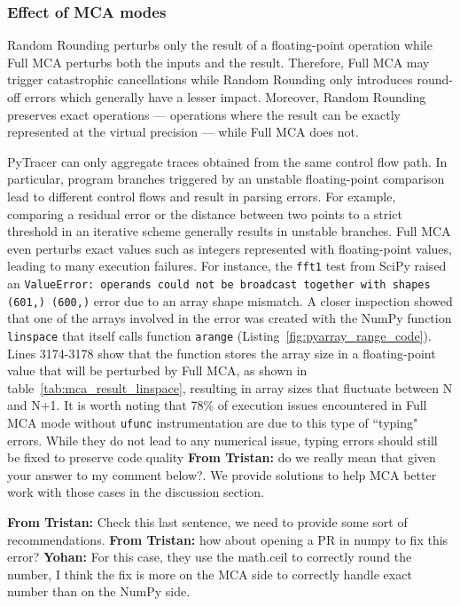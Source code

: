 \documentclass[11pt]{article}
\newcommand{\tristan}[1]{\color{orange}\textbf{From Tristan:} #1\color{black}\xspace}
\newcommand{\Yohan}[1]{\color{green!75!black}\textbf{Yohan:} #1\color{black}\xspace}
\newcommand{\pytracer}[0]{PyTracer\xspace}
\begin{document}
\subsubsection{Effect of MCA modes}
\label{sec:impact_mca_modes}
Random Rounding perturbs only the result of a floating-point operation while Full MCA perturbs both the inputs and the result. 
Therefore, Full MCA may trigger catastrophic cancellations while Random Rounding only introduces round-off errors which generally have a lesser impact.
Moreover, Random Rounding preserves exact operations --- operations where the result can be exactly represented at the virtual precision --- while Full MCA does not.

\pytracer can only aggregate traces obtained from the same control flow path. In particular, program branches triggered by an unstable floating-point comparison lead to different control flows and result in parsing errors. 
For example, comparing a residual error or the distance between two points to a strict threshold in an iterative scheme generally results in unstable branches. 
Full MCA even perturbs exact values such as integers represented with floating-point values, leading to many execution failures. For instance, the \texttt{fft1} test from SciPy raised an \texttt{ValueError: operands could not be broadcast together with shapes (601,) (600,)} error due to an array shape mismatch. A closer inspection showed that one of the arrays involved in the error was created with the NumPy function \texttt{linspace} that itself calls function \texttt{arange} (Listing~\ref{fig:pyarray_range_code}). 
Lines 3174-3178 show that the function stores the array size in a floating-point value that will be perturbed by Full MCA, as shown in table~\ref{tab:mca_result_linspace}, resulting in array sizes that fluctuate between N and N+1.
It is worth noting that 78\% of execution issues encountered in Full MCA mode without \texttt{ufunc} instrumentation
are due to this type of ``typing" errors. While they do not lead to any numerical issue, typing errors should still be fixed to preserve code quality \tristan{do we really mean that given your answer to my comment below?}. We provide solutions to help MCA better work with those cases in the discussion section.

\tristan{Check this last sentence, we need to provide some sort of recommendations}. \tristan{how about opening a PR in numpy to fix this error?}
\Yohan{For this case, they use the math.ceil to correctly round the number, I think the fix is more on the MCA side to
correctly handle exact number than on the NumPy side.}
\end{document}
